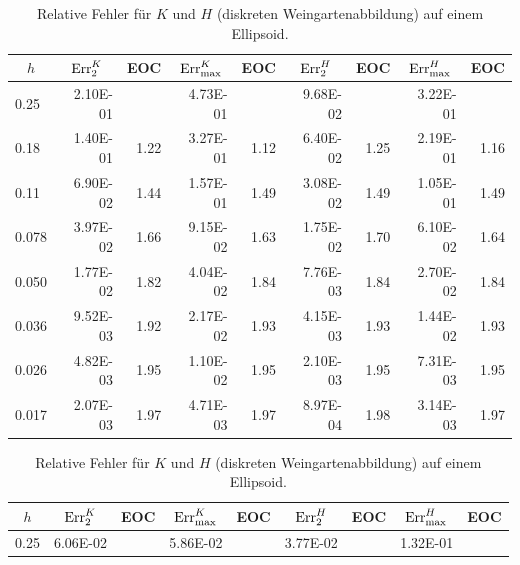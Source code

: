    \begin{table}[htbp]
      \centering
      \begin{tabular}{|l|r|r|r|r|r|r|r|r|}
      \hline
      \multicolumn{1}{|c|}{\( h \)} & \multicolumn{1}{c|}{\( \text{Err}_{2}^{K} \)} & \multicolumn{1}{c|}{EOC} & 
           \multicolumn{1}{c|}{\( \text{Err}_{\max}^{K} \)} & \multicolumn{1}{c|}{EOC} & \multicolumn{1}{c|}{\( \text{Err}_{2}^{H} \)} &
           \multicolumn{1}{c|}{EOC} & \multicolumn{1}{c|}{\( \text{Err}_{\max}^{H} \)} & \multicolumn{1}{c|}{EOC} \\ \hline
           0.25 & 2.10E-01 & \multicolumn{1}{l|}{} & 4.73E-01 & \multicolumn{1}{l|}{} & 9.68E-02 & \multicolumn{1}{l|}{} & 3.22E-01 & \multicolumn{1}{l|}{} \\ \hline
            0.18 & 1.40E-01 & 1.22 & 3.27E-01 & 1.12 & 6.40E-02 & 1.25 & 2.19E-01 & 1.16 \\ \hline
            0.11 & 6.90E-02 & 1.44 & 1.57E-01 & 1.49 & 3.08E-02 & 1.49 & 1.05E-01 & 1.49 \\ \hline
            0.078 & 3.97E-02 & 1.66 & 9.15E-02 & 1.63 & 1.75E-02 & 1.70 & 6.10E-02 & 1.64 \\ \hline
            0.050 & 1.77E-02 & 1.82 & 4.04E-02 & 1.84 & 7.76E-03 & 1.84 & 2.70E-02 & 1.84 \\ \hline
            0.036 & 9.52E-03 & 1.92 & 2.17E-02 & 1.93 & 4.15E-03 & 1.93 & 1.44E-02 & 1.93 \\ \hline
            0.026 & 4.82E-03 & 1.95 & 1.10E-02 & 1.95 & 2.10E-03 & 1.95 & 7.31E-03 & 1.95 \\ \hline
            0.017 & 2.07E-03 & 1.97 & 4.71E-03 & 1.97 & 8.97E-04 & 1.98 & 3.14E-03 & 1.97 \\ \hline
      \end{tabular}
      \caption[Weingarten auf einem Ellipsoid]{Relative Fehler für \( K \) und \( H \) (diskreten Weingartenabbildung) auf einem Ellipsoid.}
      \label{tabHeineCWeingarten}
      \vspace{10pt}
      \begin{tabular}{|l|r|r|r|r|r|r|r|r|}
      \hline
      \multicolumn{1}{|c|}{\( h \)} & \multicolumn{1}{c|}{\( \text{Err}_{2}^{K} \)} & \multicolumn{1}{c|}{EOC} & 
           \multicolumn{1}{c|}{\( \text{Err}_{\max}^{K} \)} & \multicolumn{1}{c|}{EOC} & \multicolumn{1}{c|}{\( \text{Err}_{2}^{H} \)} &
           \multicolumn{1}{c|}{EOC} & \multicolumn{1}{c|}{\( \text{Err}_{\max}^{H} \)} & \multicolumn{1}{c|}{EOC} \\ \hline
           0.25 & 6.06E-02 & \multicolumn{1}{l|}{} & 5.86E-02 & \multicolumn{1}{l|}{} & 3.77E-02 & \multicolumn{1}{l|}{} & 1.32E-01 & \multicolumn{1}{l|}{} \\ \hline

\end{tabular}
\end{table}
